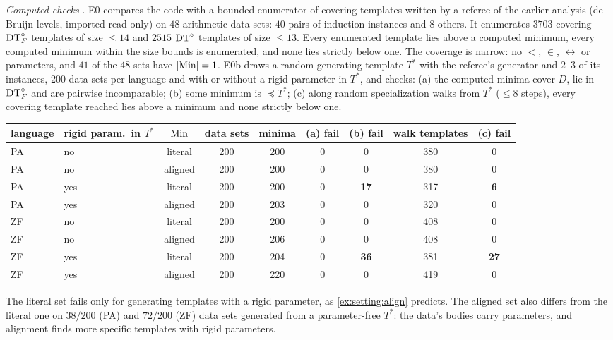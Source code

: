 \emph{Computed checks} . E0 compares the code with a bounded enumerator of covering templates written by a referee of the earlier analysis (de Bruijn levels, imported read-only) on $48$ arithmetic data sets: $40$ pairs of induction instances and $8$ others. It enumerates $3703$ covering $\mathrm{DT}^{\circ}_{F}$ templates of size $\le14$ and $2515$ $\mathrm{DT}^{\circ}$ templates of size $\le13$. Every enumerated template lies above a computed minimum, every computed minimum within the size bounds is enumerated, and none lies strictly below one. The coverage is narrow: no ${<}$, ${\in}$, ${\leftrightarrow}$ or parameters, and $41$ of the $48$ sets have $|\mathrm{Min}|=1$. E0b draws a random generating template $T^*$ with the referee's generator and $2$--$3$ of its instances, $200$ data sets per language and with or without a rigid parameter in $T^*$, and checks: (a) the computed minima cover $D$, lie in $\mathrm{DT}^{\circ}_{F}$ and are pairwise incomparable; (b) some minimum is $\preceq T^*$; (c) along random specialization walks from $T^*$ ($\le8$ steps), every covering template reached lies above a minimum and none strictly below one.

\begin{center}\small
\setlength{\tabcolsep}{5pt}
\begin{tabular}{@{}llccccccc@{}}
\toprule
language & rigid param.\ in $T^*$ & $\mathrm{Min}$ & data sets & minima & (a) fail & (b) fail & walk templates & (c) fail\\
\midrule
PA & no & literal & 200 & 200 & 0 & 0 & 380 & 0\\
PA & no & aligned & 200 & 200 & 0 & 0 & 380 & 0\\
PA & yes & literal & 200 & 200 & 0 & \textbf{17} & 317 & \textbf{6}\\
PA & yes & aligned & 200 & 203 & 0 & 0 & 320 & 0\\
ZF & no & literal & 200 & 200 & 0 & 0 & 408 & 0\\
ZF & no & aligned & 200 & 206 & 0 & 0 & 408 & 0\\
ZF & yes & literal & 200 & 204 & 0 & \textbf{36} & 381 & \textbf{27}\\
ZF & yes & aligned & 200 & 220 & 0 & 0 & 419 & 0\\
\bottomrule
\end{tabular}
\end{center}
The literal set fails only for generating templates with a rigid parameter, as \cref{ex:setting:align} predicts. The aligned set also differs from the literal one on $38/200$ (PA) and $72/200$ (ZF) data sets generated from a parameter-free $T^*$: the data's bodies carry parameters, and alignment finds more specific templates with rigid parameters.

